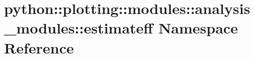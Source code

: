 \hypertarget{namespacepython_1_1plotting_1_1modules_1_1analysis__modules_1_1estimateff}{
\section{python::plotting::modules::analysis\_\-modules::estimateff Namespace Reference}
\label{namespacepython_1_1plotting_1_1modules_1_1analysis__modules_1_1estimateff}
}
